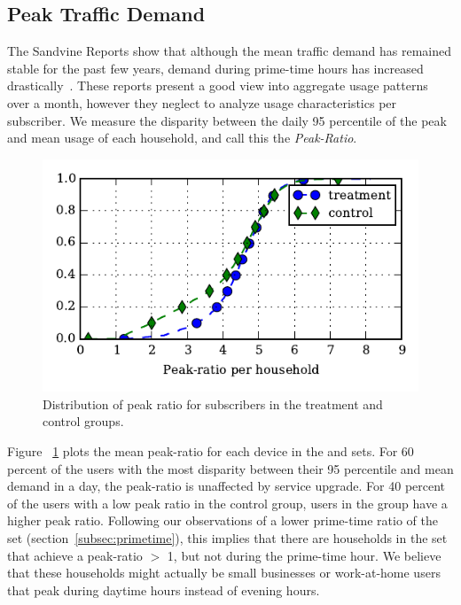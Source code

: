 \subsection{Peak Traffic Demand}\label{subsec:peakratio}

The Sandvine Reports show that although the mean traffic demand has remained
stable for the past few years, demand during prime-time hours has increased
drastically~\cite{sandvine20141h}. These reports present a good view 
into aggregate usage patterns over a month, however they neglect to analyze usage
characteristics per subscriber.
We measure the disparity between the daily 95 percentile of the peak and 
mean usage of each household, and call this the \emph{Peak-Ratio}.

\begin{figure}[t]
\begin{minipage}{1\linewidth}
\centering
\includegraphics[width=1\linewidth]{figures/peakratio-CDF-devices-MEAN.pdf}
\caption{Distribution of peak ratio for subscribers in the treatment and 
control groups.}
\label{fig:CDF-peak-ratio-mean}
\end{minipage}
\end{figure}

Figure ~\ref{fig:CDF-peak-ratio-mean} plots the mean peak-ratio for each 
device in the \treatment{} and \control{} sets.
For 60 percent of the users with the most disparity between their
95 percentile and mean demand in a day, the peak-ratio is unaffected by
service upgrade. For 40 percent of the users with a low peak ratio in the 
control
group, users in the \treatment{} group have a higher peak ratio.
Following our observations of a lower prime-time ratio of the  
\treatment{} set (section~\ref{subsec:primetime}), this implies that there are 
households in the \test set that achieve a peak-ratio $>$ 1, but not during the 
prime-time hour. We believe that these households might actually be small 
businesses or work-at-home users that peak during daytime hours instead of 
evening hours.